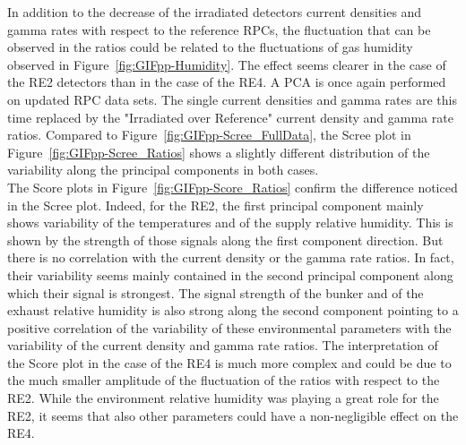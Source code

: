 	In addition to the decrease of the irradiated detectors current densities and gamma rates with respect to the reference RPCs, the fluctuation that can be observed in the ratios could be related to the fluctuations of gas humidity observed in Figure~\ref{fig:GIFpp-Humidity}. The effect seems clearer in the case of the RE2 detectors than in the case of the RE4. A PCA is once again performed on updated RPC data sets. The single current densities and gamma rates are this time replaced by the "Irradiated over Reference" current density and gamma rate ratios. Compared to Figure~\ref{fig:GIFpp-Scree_FullData}, the Scree plot in Figure~\ref{fig:GIFpp-Scree_Ratios} shows a slightly different distribution of the variability along the principal components in both cases.\\
	The Score plots in Figure~\ref{fig:GIFpp-Score_Ratios} confirm the difference noticed in the Scree plot. Indeed, for the RE2, the first principal component mainly shows variability of the temperatures and of the supply relative humidity. This is shown by the strength of those signals along the first component direction. But there is no correlation with the current density or the gamma rate ratios. In fact, their variability seems mainly contained in the second principal component along which their signal is strongest. The signal strength of the bunker and of the exhaust relative humidity is also strong along the second component pointing to a positive correlation of the variability of these environmental parameters with the variability of the current density and gamma rate ratios. The interpretation of the Score plot in the case of the RE4 is much more complex and could be due to the much smaller amplitude of the fluctuation of the ratios with respect to the RE2. While the environment relative humidity was playing a great role for the RE2, it seems that also other parameters could have a non-negligible effect on the RE4.\\
	
\begingroup\setlength{\intextsep}{0pt}\setlength{\columnsep}{15pt}

